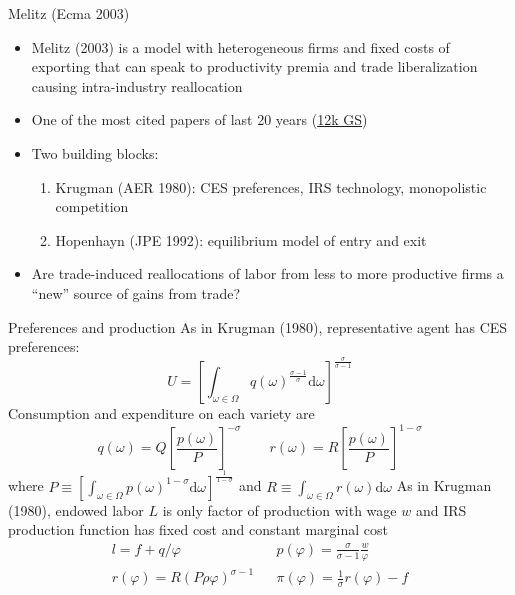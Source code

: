 \documentclass[10pt,notes=hide]{beamer}
\begin{document}
\begin{frame}{Melitz (Ecma 2003)}
\begin{itemize}
\item Melitz (2003) is a model with heterogeneous firms and fixed costs of exporting that can speak to productivity premia and trade liberalization causing intra-industry reallocation
\item One of the most cited papers of last 20 years (\href{https://scholar.google.com/citations?user=SqlfKBsAAAAJ&hl=en&oi=ao}{12k GS})
\item Two building blocks:
\begin{enumerate}
	\item Krugman (AER 1980): CES preferences, IRS technology, monopolistic competition
	\item Hopenhayn (JPE 1992): equilibrium model of entry and exit
\end{enumerate}
\item Are trade-induced reallocations of labor from less to more productive firms a ``new'' source of gains from trade?
\end{itemize}
\end{frame}
\begin{frame}{Preferences and production}
As in Krugman (1980), representative agent has CES preferences:
$$ U = \left[\int_{\omega\in\Omega} q(\omega)^{\frac{\sigma-1}{\sigma}} \textrm{d} \omega \right]^{\frac{\sigma}{\sigma-1}} $$
Consumption and expenditure on each variety are
$$
q(\omega) = Q \left[\frac{p(\omega)}{P}\right]^{-\sigma}
\qquad
r(\omega) = R \left[\frac{p(\omega)}{P}\right]^{1-\sigma}
$$
where $P\equiv \left[\int_{\omega\in\Omega} p(\omega)^{1-\sigma} \textrm{d} \omega \right]^{\frac{1}{1-\sigma}}$
and $R\equiv \int_{\omega\in\Omega} r(\omega) \textrm{d} \omega$
\medskip
As in Krugman (1980), endowed labor $L$ is only factor of production with wage $w$ and IRS production function has fixed cost and constant marginal cost
\begin{align*}
l = f + q/\varphi 
&& 
p(\varphi) = \frac{\sigma}{\sigma-1}\frac{w}{\varphi}
\\
r(\varphi) = R \left(P\rho\varphi\right)^{\sigma-1} 
&&
\pi(\varphi) = \frac{1}{\sigma} r(\varphi) - f
\end{align*}
\end{frame}
\end{document}
